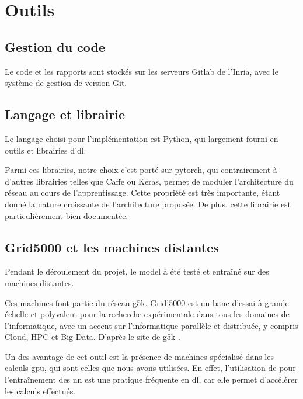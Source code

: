 \section{Outils}
\subsection{Gestion du code}
Le code et les rapports sont stockés sur les serveurs Gitlab de l'Inria, avec le système de gestion de version Git.

\subsection{Langage et librairie}
Le langage choisi pour l'implémentation est Python, qui largement fourni en outils et librairies d'\gls{dl}.

Parmi ces librairies, notre choix c'est porté sur \gls{pytorch}, qui contrairement à d'autres librairies telles que Caffe ou Keras, permet de moduler l'architecture du réseau au cours de l'apprentissage. Cette propriété est très importante, étant donné la nature \og croissante\fg{} de l'architecture proposée. De plus, cette librairie est particulièrement bien documentée.

\subsection{Grid5000 et les machines distantes}
Pendant le déroulement du projet, le \gls{model} à été testé et entraîné sur des machines distantes.

Ces machines font partie du réseau \gls{g5k}.
\og Grid'5000 est un banc d'essai à grande échelle et polyvalent pour la recherche expérimentale dans tous les domaines de l'informatique, avec un accent sur l'informatique parallèle et distribuée, y compris Cloud, HPC et Big Data. \fg{} D'après le site de \gls{g5k} \autocite{g5k}.

Un des avantage de cet outil est la présence de machines spécialisé dans les calculs \gls{gpu}, qui sont celles que nous avons utilisées. En effet, l'utilisation de  pour l'entraînement des \gls{nn} est une pratique fréquente en \gls{dl}, car elle permet d'accélérer les calculs effectués.